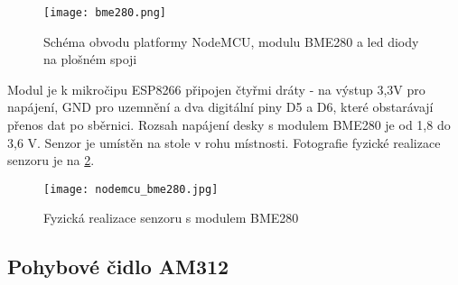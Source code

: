 \begin{figure}[H]
  \centering
  \texttt{[image: bme280.png]}
  \caption{Schéma obvodu platformy NodeMCU, modulu BME280 a led diody na plošném spoji}
  \label{fig:schema_esp_bme280}
\end{figure}

Modul je k mikročipu ESP8266 připojen čtyřmi dráty - na výstup 3,3V pro napájení, GND pro uzemnění a dva digitální piny D5 a D6, které obstarávají přenos dat po sběrnici. Rozsah napájení desky s modulem BME280 je od 1,8 do 3,6 V. Senzor je umístěn na stole v rohu místnosti. Fotografie fyzické realizace senzoru je na \cref{fig:nodemcu_bme280}.

\begin{figure}[H]
  \centering
  \texttt{[image: nodemcu\_bme280.jpg]}
  \caption{Fyzická realizace senzoru s modulem BME280}
  \label{fig:nodemcu_bme280}
\end{figure} 

\subsection{Pohybové čidlo AM312}

